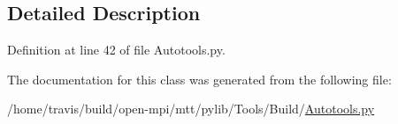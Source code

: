\subsection{Detailed Description}


Definition at line 42 of file Autotools.\-py.



The documentation for this class was generated from the following file\-:\begin{DoxyCompactItemize}
\item 
/home/travis/build/open-\/mpi/mtt/pylib/\-Tools/\-Build/\hyperlink{_autotools_8py}{Autotools.\-py}\end{DoxyCompactItemize}
